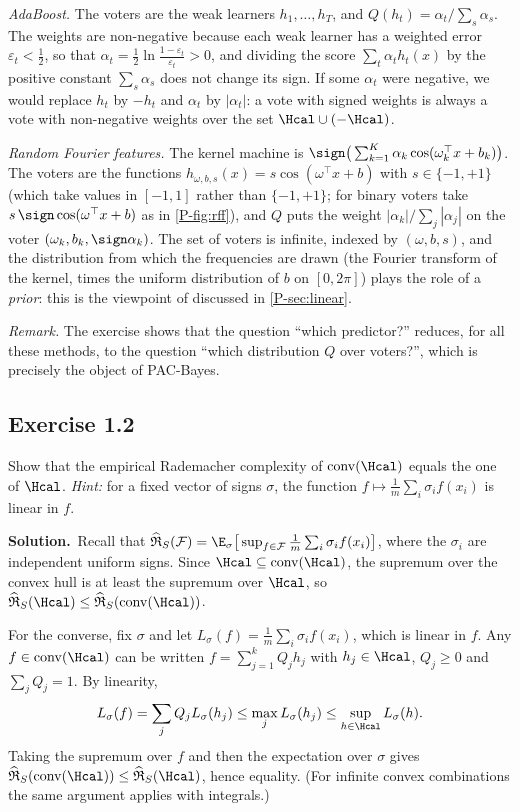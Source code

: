 \documentclass[11pt]{article}
\newcommand{\statement}[1]{\begin{tcolorbox}[enhanced,breakable,colback=black!3,colframe=black!25,boxrule=0.4pt,sharp corners,fontupper=\itshape\small]#1\end{tcolorbox}}
\newcommand{\exo}[1]{\Needspace{6\baselineskip}\subsection*{Exercise #1}\addcontentsline{toc}{subsection}{Exercise #1}}
\newcommand{\sol}{\noindent\textbf{Solution.}\ }
\begin{document}
\emph{AdaBoost.} The voters are the weak learners $h_1,\dots,h_T$, and $Q(h_t)=\alpha_t/\sum_s\alpha_s$. The weights are
non-negative because each weak learner has a weighted error $\varepsilon_t<\frac12$, so that
$\alpha_t=\frac12\ln\frac{1-\varepsilon_t}{\varepsilon_t}>0$, and dividing the score $\sum_t\alpha_th_t(x)$ by the positive
constant $\sum_s\alpha_s$ does not change its sign. If some $\alpha_t$ were negative, we would replace $h_t$ by $-h_t$ and
$\alpha_t$ by $|\alpha_t|$: a vote with signed weights is always a vote with non-negative weights over the set
$\Hcal\cup(-\Hcal)$.

\emph{Random Fourier features.} The kernel machine is $\sign\big(\sum_{k=1}^K\alpha_k\cos(\omega_k^\top x+b_k)\big)$. The voters are
the functions $h_{\omega,b,s}(x)=s\cos(\omega^\top x+b)$ with $s\in\{-1,+1\}$ (which take values in $[-1,1]$ rather than
$\{-1,+1\}$; for binary voters take $s\,\sign\cos(\omega^\top x+b)$ as in \cref{P-fig:rff}), and $Q$ puts the weight
$|\alpha_k|/\sum_j|\alpha_j|$ on the voter $(\omega_k,b_k,\sign\alpha_k)$. The set of voters is infinite, indexed by
$(\omega,b,s)$, and the distribution from which the frequencies are drawn (the Fourier transform of the kernel,
times the uniform distribution of $b$ on $[0,2\pi]$) plays the role of a \emph{prior}: this is the viewpoint of
\citet{letarte2019pseudo} discussed in \cref{P-sec:linear}.

\emph{Remark.} The exercise shows that the question ``which predictor?'' reduces, for all these methods, to the
question ``which distribution $Q$ over voters?'', which is precisely the object of PAC-Bayes.

\exo{1.2}
\statement{Show that the empirical Rademacher complexity of $\mathrm{conv}(\Hcal)$ equals the one of $\Hcal$.
\emph{Hint:} for a fixed vector of signs $\sigma$, the function $f\mapsto\frac1m\sum_i\sigma_if(x_i)$ is linear in $f$.}

\sol Recall that $\widehat{\mathfrak R}_S(\mathcal F)=\E_\sigma\big[\sup_{f\in\mathcal F}\frac1m\sum_i\sigma_if(x_i)\big]$, where the
$\sigma_i$ are independent uniform signs. Since $\Hcal\subseteq\mathrm{conv}(\Hcal)$, the supremum over the convex hull is at
least the supremum over $\Hcal$, so $\widehat{\mathfrak R}_S(\Hcal)\leq\widehat{\mathfrak R}_S(\mathrm{conv}(\Hcal))$.

For the converse, fix $\sigma$ and let $L_\sigma(f)=\frac1m\sum_i\sigma_if(x_i)$, which is linear in $f$. Any
$f\in\mathrm{conv}(\Hcal)$ can be written $f=\sum_{j=1}^kQ_jh_j$ with $h_j\in\Hcal$, $Q_j\geq0$ and $\sum_jQ_j=1$. By linearity,
\[
L_\sigma(f)=\sum_jQ_jL_\sigma(h_j)\leq\max_jL_\sigma(h_j)\leq\sup_{h\in\Hcal}L_\sigma(h).
\]
Taking the supremum over $f$ and then the expectation over $\sigma$ gives
$\widehat{\mathfrak R}_S(\mathrm{conv}(\Hcal))\leq\widehat{\mathfrak R}_S(\Hcal)$, hence equality. (For infinite convex combinations
the same argument applies with integrals.)
\end{document}
